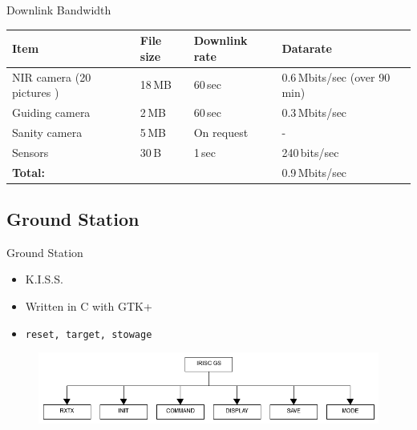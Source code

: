\documentclass[11pt, aspectratio=169]{beamer}
\begin{document}
\begin{frame}[c]{Downlink Bandwidth}
\centering
\hspace*{-.3cm}
\begin{tabular}{| l | l | l | l |}
	\hline
	\textbf{Item} & \textbf{File size} & \textbf{Downlink rate} & \textbf{Datarate} \\\hline\hline
	
	NIR camera (20 pictures ) & 18\,MB & 60\,sec & 0.6\,Mbits/sec (over 90 min) \\\hline
	Guiding camera		   & 2\,MB	& 60\,sec	& 0.3\,Mbits/sec \\\hline
	Sanity camera		   & 5\,MB  & On request& - \\\hline
	Sensors				   & 30\,B  & 1\,sec 	& 240\,bits/sec \\\hline\hline
	\textbf{Total:} 	   &		& 			& 0.9\,Mbits/sec \\\hline
	

\end{tabular}
\end{frame}

\subsection{Ground Station} 	%
\begin{frame}{Ground Station}
\begin{itemize}
	\item K.I.S.S.
	\item Written in C with GTK+
	\item \texttt{reset, target, stowage}
\end{itemize}
\begin{figure}
	\includegraphics[scale=0.4]{figures/images/GSS-tree.png}
\end{figure}
\end{frame}
\end{document}
